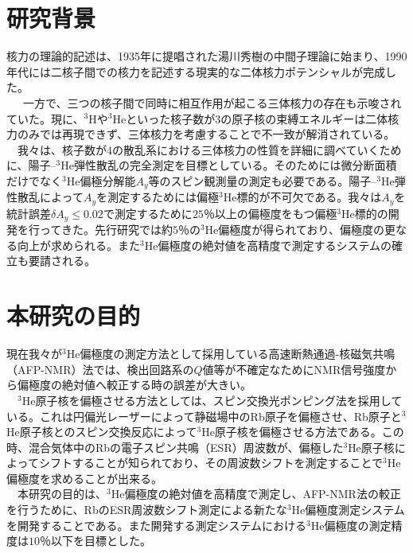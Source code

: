 \documentclass[twocolumn,11pt,uplatex]{jsarticle}
\begin{document}
 
 \pagestyle{empty}
 
\section{研究背景}
核力の理論的記述は、1935年に提唱された湯川秀樹の中間子理論に始まり、1990年代には二核子間での核力を記述する現実的な二体核力ポテンシャルが完成した。\\\
　一方で、三つの核子間で同時に相互作用が起こる三体核力の存在も示唆されていた。現に、$^3$Hや$^3$Heといった核子数が3の原子核の束縛エネルギーは二体核力のみでは再現できず、三体核力を考慮することで不一致が解消されている。\\
　我々は、核子数が4の散乱系における三体核力の性質を詳細に調べていくために、陽子--$^3$He弾性散乱の完全測定を目標としている。そのためには微分断面積だけでなく$^3$He偏極分解能$A_y$等のスピン観測量の測定も必要である。陽子--$^3$He弾性散乱によって$A_y$を測定するためには偏極$^3$He標的が不可欠である。我々は$A_y$を統計誤差$\delta A_y \le 0.02$で測定するために$25$％以上の偏極度をもつ偏極$^3$He標的の開発を行ってきた\cite{wada, shiokawa}。先行研究では約$5$％の$^3$He偏極度が得られており、偏極度の更なる向上が求められる。また$^3$He偏極度の絶対値を高精度で測定するシステムの確立も要請される。


\section{本研究の目的}
現在我々が$^3$He偏極度の測定方法として採用している高速断熱通過-核磁気共鳴（AFP-NMR）法では、検出回路系の$Q$値等が不確定なためにNMR信号強度から偏極度の絶対値へ較正する時の誤差が大きい。\\
　$^3$He原子核を偏極させる方法としては、スピン交換光ポンピング法を採用している。これは円偏光レーザーによって静磁場中のRb原子を偏極させ、Rb原子と$^3$He原子核とのスピン交換反応によって$^3$He原子核を偏極させる方法である。この時、混合気体中のRbの電子スピン共鳴（ESR）周波数が、偏極した$^3$He原子核によってシフトすることが知られており、その周波数シフトを測定することで$^3$He偏極度を求めることが出来る。\\
　本研究の目的は、$^3$He偏極度の絶対値を高精度で測定し、AFP-NMR法の較正を行うために、RbのESR周波数シフト測定による新たな$^3$He偏極度測定システムを開発することである。また開発する測定システムにおける$^3$He偏極度の測定精度は$10$％以下を目標とした。
\end{document}
